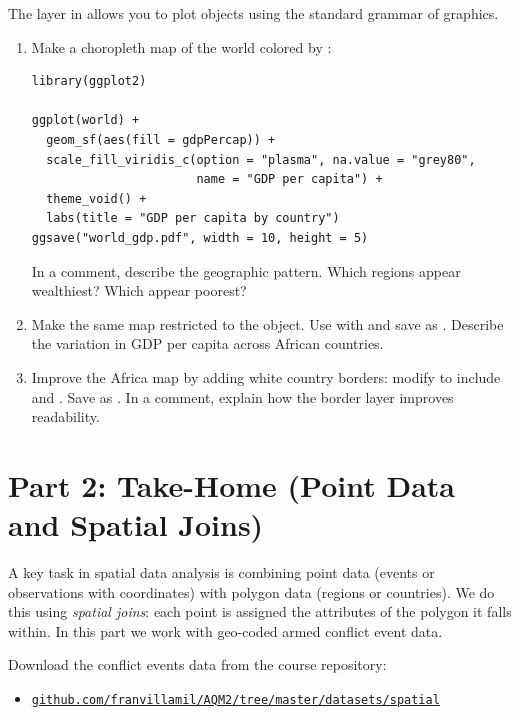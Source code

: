 The  layer in  allows you to plot  objects using the standard grammar of graphics.

\begin{enumerate}[label=\alph*)]
  \item Make a choropleth map of the world colored by :
  \begin{lstlisting}
library(ggplot2)

ggplot(world) +
  geom_sf(aes(fill = gdpPercap)) +
  scale_fill_viridis_c(option = "plasma", na.value = "grey80",
                       name = "GDP per capita") +
  theme_void() +
  labs(title = "GDP per capita by country")
ggsave("world_gdp.pdf", width = 10, height = 5)
  \end{lstlisting}
  In a comment, describe the geographic pattern. Which regions appear wealthiest? Which appear poorest?

  \item Make the same map restricted to the  object. Use  with  and save as . Describe the variation in GDP per capita across African countries.

  \item Improve the Africa map by adding white country borders: modify  to include  and . Save as . In a comment, explain how the border layer improves readability.
\end{enumerate}

\newpage

\section{Part 2: Take-Home (Point Data and Spatial Joins)}

A key task in spatial data analysis is combining point data (events or observations with coordinates) with polygon data (regions or countries). We do this using \textit{spatial joins}: each point is assigned the attributes of the polygon it falls within. In this part we work with geo-coded armed conflict event data.

Download the conflict events data from the course repository:
\begin{itemize}
  \item \href{https://github.com/franvillamil/AQM2/tree/master/datasets/spatial}{\texttt{github.com/franvillamil/AQM2/tree/master/datasets/spatial}}
\end{itemize}

